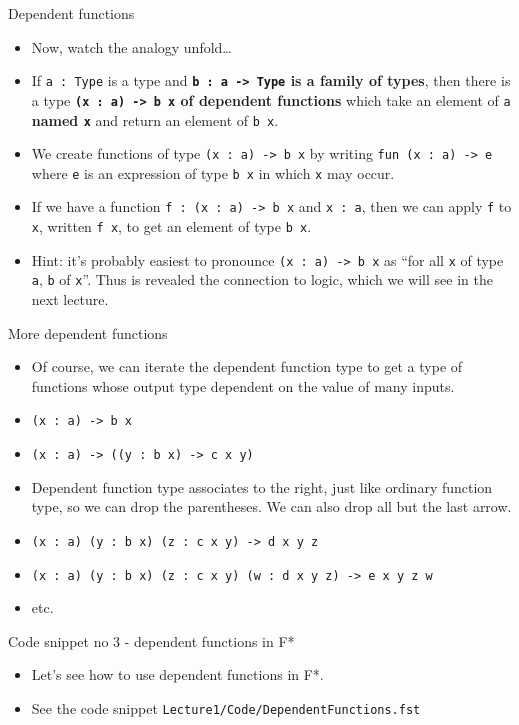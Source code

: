 \documentclass{beamer}
\newcommand{\m}[1]{\texttt{#1}}
\begin{document}
\begin{frame}{Dependent functions}
\begin{itemize}
	\item Now, watch the analogy unfold\dots
	\item If \m{a :\ Type} is a type and \textbf{\m{b :\ a -> Type} is a family of types}, then there is a type \textbf{\m{(x :\ a) -> b x} of dependent functions} which take an element of \m{a} \textbf{named \m{x}} and return an element of \m{b x}.
	\item We create functions of type \m{(x :\ a) -> b x} by writing \m{fun (x :\ a) -> e} where \m{e} is an expression of type \m{b x} in which \m{x} may occur.
	\item If we have a function \m{f :\ (x :\ a) -> b x} and \m{x :\ a}, then we can apply \m{f} to \m{x}, written \m{f x}, to get an element of type \m{b x}.
	\item Hint: it's probably easiest to pronounce \m{(x :\ a) -> b x} as ``for all \m{x} of type \m{a}, \m{b} of \m{x}''. Thus is revealed the connection to logic, which we will see in the next lecture.
\end{itemize}
\end{frame}

\begin{frame}{More dependent functions}
\begin{itemize}
	\item Of course, we can iterate the dependent function type to get a type of functions whose output type dependent on the value of many inputs.
	\item \m{(x :\ a) -> b x}
	\item \m{(x :\ a) -> ((y :\ b x) -> c x y)}
	\item Dependent function type associates to the right, just like ordinary function type, so we can drop the parentheses. We can also drop all but the last arrow.
	\item \m{(x :\ a) (y :\ b x) (z :\ c x y) -> d x y z}
	\item \m{(x :\ a) (y :\ b x) (z :\ c x y) (w : d x y z) -> e x y z w}
	\item etc.
\end{itemize}
\end{frame}

\begin{frame}{Code snippet no 3 - dependent functions in F*}
\begin{itemize}
	\item Let's see how to use dependent functions in F*.
	\item See the code snippet \m{Lecture1/Code/DependentFunctions.fst}
\end{itemize}
\end{frame}
\end{document}

